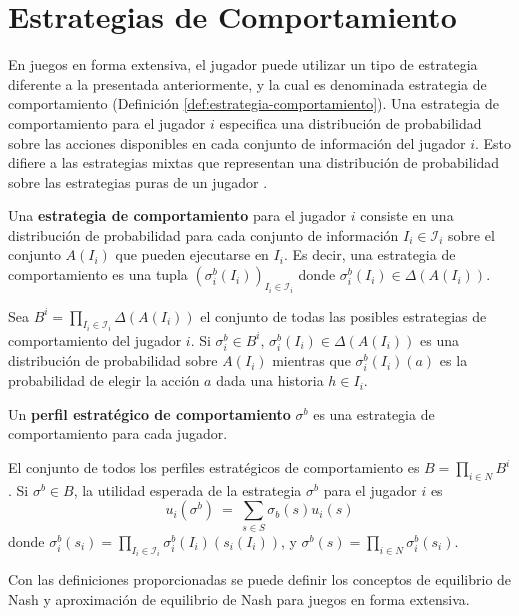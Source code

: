 \section{Estrategias de Comportamiento}

En juegos en forma extensiva, el jugador puede utilizar un tipo de estrategia diferente a la presentada anteriormente, y la cual es denominada estrategia de comportamiento (Definición \ref{def:estrategia-comportamiento}). Una estrategia de comportamiento para el jugador $i$ especifica una distribución de probabilidad sobre las acciones disponibles en cada conjunto de información del jugador $i$. Esto difiere a las estrategias mixtas que representan una distribución de probabilidad sobre las estrategias puras de un jugador \cite[p. 212]{bib:course-game-theory}. 

\begin{definition}
\label{def:estrategia-comportamiento}
Una \textbf{estrategia de comportamiento} para el jugador $i$ consiste en una distribución de probabilidad para cada conjunto de información $I_i \in \mathcal{I}_i$ sobre el conjunto $A(I_i)$ que pueden ejecutarse en $I_i$.
Es decir, una estrategia de comportamiento es una tupla $(\sigma^b_i(I_i))_{I_i \in \mathcal{I}_i}$ donde $\sigma^b_i(I_i) \in \Delta(A(I_i))$.
\end{definition}

Sea $B^i = \prod_{I_i \in \mathcal{I}_i} \Delta(A(I_i))$ el conjunto de todas las posibles estrategias de comportamiento del jugador $i$. Si $\sigma_i^b \in B^i$, $\sigma_i^b(I_i) \in \Delta(A(I_i))$ es una distribución de probabilidad sobre $A(I_i)$ mientras que $\sigma_i^b(I_i)(a)$ es la probabilidad de elegir la acción $a$ dada una historia $h \in I_i$.

\begin{definition}
Un \textbf{perfil estratégico de comportamiento} $\sigma^b$ es una estrategia de comportamiento para cada jugador.
\end{definition}

El conjunto de todos los perfiles estratégicos de comportamiento es $B = \prod_{i \in N} B^i$. Si $\sigma^b \in B$, la utilidad esperada de la estrategia $\sigma^b$ para el jugador $i$ es
\[ u_i(\sigma^b)\ =\ \sum_{s \in S} \sigma_b(s)u_i(s) \]
donde $\sigma_i^b(s_i) = \prod_{I_i \in \mathcal{I}_i} \sigma_i^b(I_i)(s_i(I_i))$, y $\sigma^b(s) =  \prod_{i \in N} \sigma_i^b(s_i)$.

Con las definiciones proporcionadas se puede definir los conceptos de equilibrio de Nash y aproximación de equilibrio de Nash para juegos en forma extensiva.

